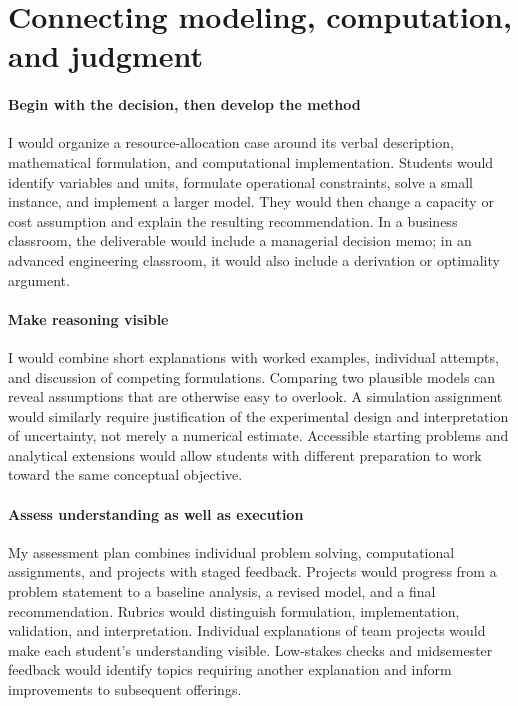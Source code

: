 \documentclass[11pt,letterpaper]{article}
\begin{document}
\section{Connecting modeling, computation, and judgment}

\paragraph{Begin with the decision, then develop the method}
I would organize a resource-allocation case around its verbal description,
mathematical formulation, and computational implementation. Students would
identify variables and units, formulate operational constraints, solve a
small instance, and implement a larger model. They would then change a
capacity or cost assumption and explain the resulting recommendation. In a
business classroom, the deliverable would include a managerial decision
memo; in an advanced engineering classroom, it would also include a
derivation or optimality argument.

\paragraph{Make reasoning visible}
I would combine short explanations with worked examples, individual
attempts, and discussion of competing formulations. Comparing two plausible
models can reveal assumptions that are otherwise easy to overlook. A
simulation assignment would similarly require justification of the
experimental design and interpretation of uncertainty, not merely a
numerical estimate. Accessible starting problems and analytical extensions
would allow students with different preparation to work toward the same
conceptual objective.

\paragraph{Assess understanding as well as execution}
My assessment plan combines individual problem solving, computational
assignments, and projects with staged feedback. Projects would progress
from a problem statement to a baseline analysis, a revised model, and a
final recommendation. Rubrics would distinguish formulation,
implementation, validation, and interpretation. Individual explanations
of team projects would make each student's understanding visible.
Low-stakes checks and midsemester feedback would identify topics requiring
another explanation and inform improvements to subsequent offerings.
\end{document}
